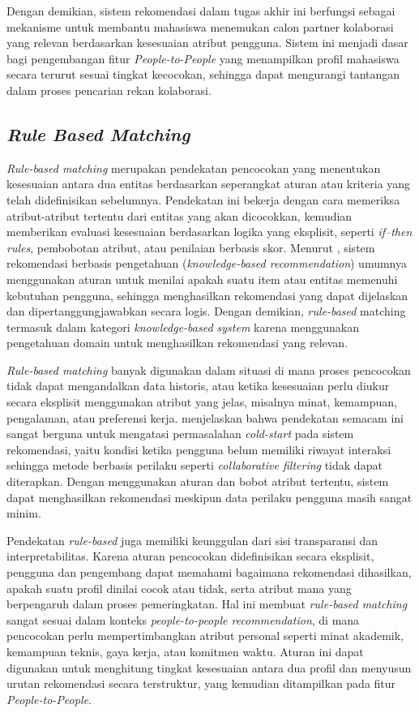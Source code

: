 Dengan demikian, sistem rekomendasi dalam tugas akhir ini berfungsi sebagai mekanisme untuk membantu mahasiswa menemukan calon partner kolaborasi yang relevan berdasarkan kesesuaian atribut pengguna. Sistem ini menjadi dasar bagi pengembangan fitur \textit{People-to-People} yang menampilkan profil mahasiswa secara terurut sesuai tingkat kecocokan, sehingga dapat mengurangi tantangan dalam proses pencarian rekan kolaborasi.

\subsection{\textit{Rule Based Matching}}
\textit{Rule-based matching} merupakan pendekatan pencocokan yang menentukan kesesuaian antara dua entitas berdasarkan seperangkat aturan atau kriteria yang telah didefinisikan sebelumnya. Pendekatan ini bekerja dengan cara memeriksa atribut-atribut tertentu dari entitas yang akan dicocokkan, kemudian memberikan evaluasi kesesuaian berdasarkan logika yang eksplisit, seperti \textit{if–then rules}, pembobotan atribut, atau penilaian berbasis skor. Menurut \textcite{burkeKnowledgebasedRecommenderSystems}, sistem rekomendasi berbasis pengetahuan (\textit{knowledge-based recommendation}) umumnya menggunakan aturan untuk menilai apakah suatu item atau entitas memenuhi kebutuhan pengguna, sehingga menghasilkan rekomendasi yang dapat dijelaskan dan dipertanggungjawabkan secara logis. Dengan demikian, \textit{rule-based} matching termasuk dalam kategori \textit{knowledge-based system} karena menggunakan pengetahuan domain untuk menghasilkan rekomendasi yang relevan.

\textit{Rule-based matching} banyak digunakan dalam situasi di mana proses pencocokan tidak dapat mengandalkan data historis, atau ketika kesesuaian perlu diukur secara eksplisit menggunakan atribut yang jelas, misalnya minat, kemampuan, pengalaman, atau preferensi kerja. \textcite{adomaviciusNextGenerationRecommender2005} menjelaskan bahwa pendekatan semacam ini sangat berguna untuk mengatasi permasalahan \textit{cold-start} pada sistem rekomendasi, yaitu kondisi ketika pengguna belum memiliki riwayat interaksi sehingga metode berbasis perilaku seperti \textit{collaborative filtering} tidak dapat diterapkan. Dengan menggunakan aturan dan bobot atribut tertentu, sistem dapat menghasilkan rekomendasi meskipun data perilaku pengguna masih sangat minim.

Pendekatan \textit{rule-based} juga memiliki keunggulan dari sisi transparansi dan interpretabilitas. Karena aturan pencocokan didefinisikan secara eksplisit, pengguna dan pengembang dapat memahami bagaimana rekomendasi dihasilkan, apakah suatu profil dinilai cocok atau tidak, serta atribut mana yang berpengaruh dalam proses pemeringkatan. Hal ini membuat \textit{rule-based matching} sangat sesuai dalam konteks \textit{people-to-people recommendation}, di mana pencocokan perlu mempertimbangkan atribut personal seperti minat akademik, kemampuan teknis, gaya kerja, atau komitmen waktu. Aturan ini dapat digunakan untuk menghitung tingkat kesesuaian antara dua profil dan menyusun urutan rekomendasi secara terstruktur, yang kemudian ditampilkan pada fitur \textit{People-to-People}.

